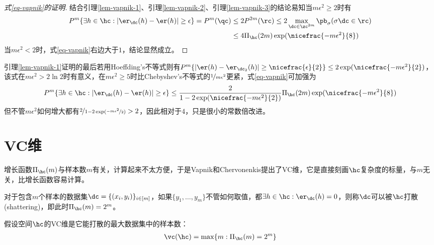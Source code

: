 \documentclass{ctexart}
\begin{document}
\begin{proof} [式\eqref{eq-vapnik}的证明]
    结合引理\ref{lem-vapnik-1}、引理\ref{lem-vapnik-2}、引理\ref{lem-vapnik-3}的结论易知当$m \epsilon^2 \ge 2$时有
    \begin{align*}
        P^m \{ \exists h \in \hc: |\er_\dc (h) - \er (h)| \ge \epsilon \} = P^m (\qc)
         & \le 2 P^{2m} (\rc) \le 2 \max_{\dc \in \zc^{2m}} \pb_\sigma (\sigma \dc \in \rc) \\
         & \le 4 \Pi_\hc (2m) \exp ( \nicefrac{-m \epsilon^2}{8} )
    \end{align*}
    当$m \epsilon^2 < 2$时，式\eqref{eq-vapnik}右边大于$1$，结论显然成立。
\end{proof}

\begin{remark}
    引理\ref{lem-vapnik-1}证明的最后若用Hoeffding's不等式则有$P^m \{ |\er(h) - \er_{\dc_2} (h)| \ge \nicefrac{\epsilon}{2} \} \le 2 \exp( \nicefrac{-m\epsilon^2}{2})$，该式在$m \epsilon^2 > 2 \ln 2$时有意义，在$m \epsilon^2 \ge 5$时比Chebyshev's不等式的$\nicefrac{1}{m \epsilon^2}$更紧，式\eqref{eq-vapnik}可加强为
    \begin{align*}
        P^m \{ \exists h \in \hc: |\er_\dc (h) - \er (h)| \ge \epsilon \} \le \frac{2}{1 - 2 \exp( \nicefrac{-m\epsilon^2}{2})} \Pi_\hc (2m) \exp ( \nicefrac{-m \epsilon^2}{8} )
    \end{align*}
    但不管$m \epsilon^2$如何增大都有$\nicefrac{2}{1 - 2 \exp( \nicefrac{-m\epsilon^2}{2})} > 2$，因此相对于$4$，只是很小的常数倍改进。
\end{remark}

\section{VC维}

增长函数$\Pi_\hc (m)$与样本数$m$有关，计算起来不太方便，于是Vapnik和Chervonenkis提出了VC维，它是直接刻画$\hc$复杂度的标量，与$m$无关，比增长函数容易计算。

\begin{definition}[VC维] \label{defn: VC dimension}
    对于包含$m$个样本的数据集$\dc = \{ (x_i ,y_i) \}_{i \in [m]}$，如果$\{y_1, \ldots, y_m\}$不管如何取值，都$\exists h \in \hc: \er_\dc (h) = 0$，则称$\dc$可以被$\hc$打散(shattering)，即此时$\Pi_\hc (m) = 2^m$。

    假设空间$\hc$的VC维是它能打散的最大数据集中的样本数：
    \begin{align*}
        \vc(\hc) = \max \{ m: \Pi_\hc (m) = 2^m \}
    \end{align*}
\end{definition}
\end{document}
